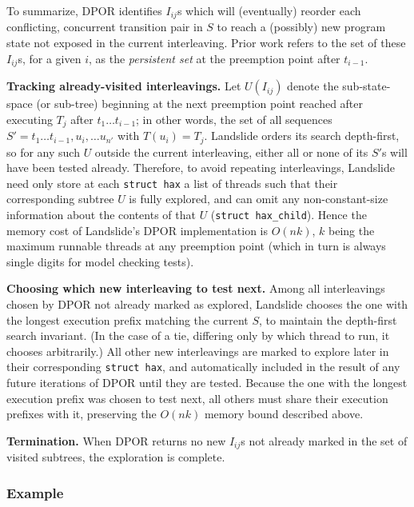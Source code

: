 To summarize, %
DPOR identifies $I_{ij}$s which will (eventually) reorder each conflicting, concurrent transition pair in $S$
to reach a (possibly) new program state not exposed in the current interleaving.
Prior work \cite{partial-order-methods,dpor,optimal-dpor} refers to the set of these $I_{ij}$s,
for a given $i$,
as the {\em persistent set} at the preemption point after $t_{i-1}$.

{\bf Tracking already-visited interleavings.}
Let $U(I_{ij})$ denote the sub-state-space (or sub-tree) beginning at the next preemption point reached
after executing $T_j$ after $t_1 \dots t_{i-1}$;
in other words, the set of all sequences $S' = t_1 \dots t_{i-1}, u_i, \dots u_{n'}$ with $T(u_i) = T_j$.
Landslide orders its search depth-first,
so for any such $U$ outside the current interleaving,
either all or none of its $S'$s will have been tested already.
Therefore, to avoid repeating interleavings,
Landslide need only store at each {\tt struct hax} a list of threads
such that their corresponding subtree $U$ is fully explored,
and can omit any non-constant-size information about the contents of that $U$
({\tt struct hax\_child}).
Hence the memory cost of Landslide's DPOR implementation is $O(nk)$,
$k$ being the maximum runnable threads at any preemption point
(which in turn is always single digits for model checking tests).

{\bf Choosing which new interleaving to test next.}
Among all interleavings chosen by DPOR not already marked as explored,
Landslide chooses the one with the longest execution prefix matching the current $S$,
to maintain the depth-first search invariant.
(In the case of a tie, differing only by which thread to run, it chooses arbitrarily.)
All other new interleavings are marked to explore later in their corresponding {\tt struct hax},
and automatically included in the result of any future iterations of DPOR until they are tested.
Because the one with the longest execution prefix was chosen to test next,
all others must share their execution prefixes with it,
preserving the $O(nk)$ memory bound described above.

{\bf Termination.}
When DPOR returns no new $I_{ij}$s not already marked in the set of visited subtrees,
the exploration is complete.

\subsubsection{Example}
\label{sec:landslide-dpor-example}

